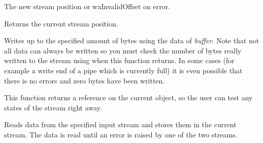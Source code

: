 

The new stream position or wxInvalidOffset on error.


\label{wxoutputstreamtello}


Returns the current stream position.


\label{wxoutputstreamwrite}


Writes up to the specified amount of bytes using the data of {\it buffer}. Note
that not all data can always be written so you must check the number of bytes
really written to the stream using  
when this function returns. In some cases (for example a write end of a pipe
which is currently full) it is even possible that there is no errors and zero
bytes have been written.

This function returns a reference on the current object, so the user can test
any states of the stream right away.


Reads data from the specified input stream and stores them 
in the current stream. The data is read until an error is raised
by one of the two streams.

